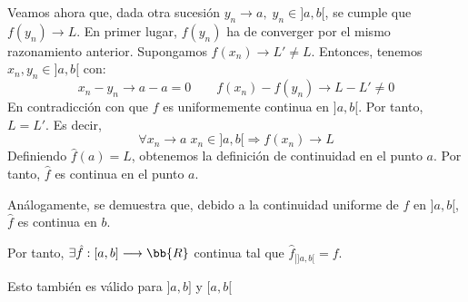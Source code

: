 \begin{ejercicio}
\begin{description}
    Veamos ahora que, dada otra sucesión $y_n\to a,\;y_n\in]a,b[$, se cumple que $f(y_n)\to L$. En primer lugar, $f(y_n)$ ha de converger por el mismo razonamiento anterior. Supongamos $f(x_n)\to L'\neq L$. Entonces, tenemos $x_n,y_n\in ]a,b[$ con:
    \begin{equation*}
        x_n-y_n\to a-a=0 \qquad f(x_n)-f(y_n)\to L-L'\neq 0
    \end{equation*}
    En contradicción con que $f$ es uniformemente continua en $]a,b[$. Por tanto, $L=L'$. Es decir,
    \begin{equation*}
        \forall x_n\to a\;x_n\in ]a,b[ \Longrightarrow f(x_n)\to L
    \end{equation*}
    Definiendo $\hat{f}(a)=L$, obtenemos la definición de continuidad en el punto $a$. Por tanto, $\hat{f}$ es continua en el punto $a$.

    Análogamente, se demuestra que, debido a la continuidad uniforme de $f$ en $]a,b[$, $\hat{f}$ es continua en $b$.
    
    Por tanto, $\exists \hat{f}:[a,b]\longrightarrow \bb{R}$ continua tal que $\hat{f}_{\left|]a,b[ \right.}=f$.

    \begin{comment}
        Como $f$ es uniformemente continua en $]a,b[ \text{ (acotado)}\Longrightarrow f(]a,b[) \text{ acotado}$. Por tanto, $\exists M>0\mid f(x)\in [-M,M]\;\forall x\in]a,b[$.

    Sea $x_n\to a,\;x_n\in ]a,b[$. Como $f(x_n)\in[-M,M]$ acotado, por el Teorema de Bolzano-Weierstrass, $\exists f(x_{\sigma(n)})\to L\in \bb{R}$.

    Supongamos ahora que $\exists y_n\to a$ con $f(y_n)\nrightarrow L\Longrightarrow \exists \varepsilon_0 \mid |f(y_n)-L|\geq \varepsilon\;\forall n$.
    \end{comment}
    \end{description}

    \begin{observacion}
        Esto también es válido para $]a,b]$ y $[a, b[$
    \end{observacion}
\end{ejercicio}

